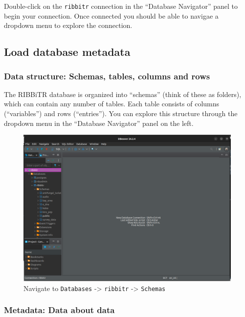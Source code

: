 \documentclass[
  letterpaper,
  DIV=11,
  numbers=noendperiod]{scrartcl}
\begin{document}
Double-click on the \texttt{ribbitr} connection in the ``Database
Navigator'' panel to begin your connection. Once connected you should be
able to navigae a dropdown menu to explore the connection.

\subsection{Load database metadata}\label{load-database-metadata-2}

\subsubsection{Data structure: Schemas, tables, columns and
rows}\label{data-structure-schemas-tables-columns-and-rows-2}

The RIBBiTR database is organized into ``schemas'' (think of these as
folders), which can contain any number of tables. Each table consists of
columns (``variables'') and rows (``entries''). You can explore this
structure through the dropdown menu in the ``Database Navigator'' panel
on the left.

\begin{figure}[H]

{\centering \includegraphics{images/DBeaver_data_discovery_01.png}

}

\caption{Navigate to \texttt{Databases} -\textgreater{} \texttt{ribbitr}
-\textgreater{} \texttt{Schemas}}

\end{figure}%

\subsubsection{Metadata: Data about
data}\label{metadata-data-about-data-2}
\end{document}
